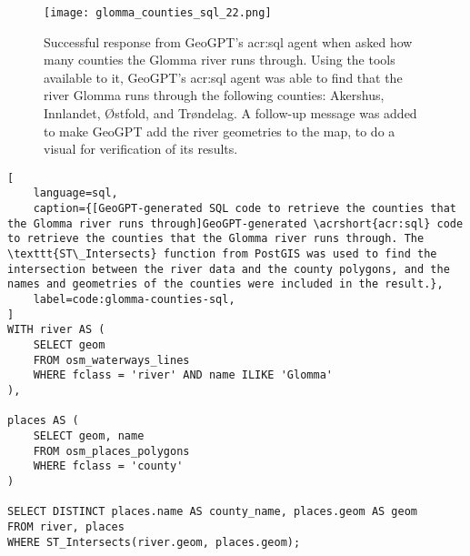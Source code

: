 \begin{figure}[htbp]
    \centering
    \texttt{[image: glomma\_counties\_sql\_22.png]}
    \caption[Successful response from GeoGPT's SQL agent when asked how many counties the Glomma river runs through]{Successful response from GeoGPT's \acrshort{acr:sql} agent when asked how many counties the Glomma river runs through. Using the tools available to it, GeoGPT's \acrshort{acr:sql} agent was able to find that the river Glomma runs through the following counties: Akershus, Innlandet, Østfold, and Trøndelag. A follow-up message was added to make GeoGPT add the river geometries to the map, to do a visual for verification of its results.}
    \label{fig:glomma-counties-sql-successful}
\end{figure}

\FloatBarrier

\begin{lstlisting}[
    language=sql,
    caption={[GeoGPT-generated SQL code to retrieve the counties that the Glomma river runs through]GeoGPT-generated \acrshort{acr:sql} code to retrieve the counties that the Glomma river runs through. The \texttt{ST\_Intersects} function from PostGIS was used to find the intersection between the river data and the county polygons, and the names and geometries of the counties were included in the result.},
    label=code:glomma-counties-sql,
]
WITH river AS (
    SELECT geom 
    FROM osm_waterways_lines 
    WHERE fclass = 'river' AND name ILIKE 'Glomma'
),

places AS (
    SELECT geom, name 
    FROM osm_places_polygons 
    WHERE fclass = 'county'
)

SELECT DISTINCT places.name AS county_name, places.geom AS geom
FROM river, places
WHERE ST_Intersects(river.geom, places.geom);    
\end{lstlisting}

\FloatBarrier

